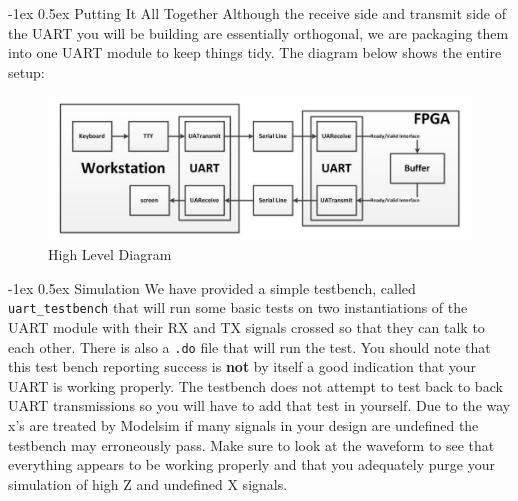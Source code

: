 \documentclass[11pt]{article}
\makeatletter
\renewcommand{\subsection}
{\@startsection {subsection}{1}{0pt}
 {-1ex}
 {0.5ex}
 {\bfseries\normalsize}}
\makeatother
\begin{document}
\subsection{Putting It All Together}
Although the receive side and transmit side of the UART you will be building are essentially orthogonal, we are packaging them into one UART module to keep things tidy.
The diagram below shows the entire setup:
\begin{figure}[H]
  \centerline{\includegraphics[width=6in]{figs/high_level_diagram.png}}
  \caption{High Level Diagram}
\end{figure}

\subsection{Simulation}
We have provided a simple testbench, called \verb|uart_testbench| that will run some basic tests on two instantiations of the UART module with their RX and TX signals crossed so that they can talk to each other. There is also a \verb|.do| file that will run the test. You should note that this test bench reporting success is \textbf{not} by itself a good indication that your UART is working properly. The testbench does not attempt to test back to back UART transmissions so you will have to add that test in yourself. Due to the way x's are treated by Modelsim if many signals in your design are undefined the testbench may erroneously pass. Make sure to look at the waveform to see that everything appears to be working properly and that you adequately purge your simulation of high Z and undefined X signals.
\end{document}
